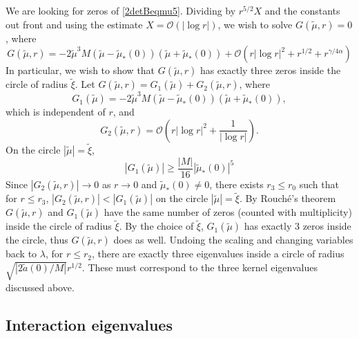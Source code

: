 \documentclass[thesis.tex]{subfiles}
\begin{document}
We are looking for zeros of \cref{2detBeqmu5}. Dividing by $r^{5/2}X$ and the constants out front and using the estimate $X = \mathcal{O}(|\log r|)$, we wish to solve $G(\tilde{\mu}, r) = 0$, where
\begin{equation}\label{2peigG}
G(\tilde{\mu}, r) = -2 \tilde{\mu}^3 M (\tilde{\mu} - \tilde{\mu}_*(0)) (\tilde{\mu} + \tilde{\mu}_*(0)) + \mathcal{O}\left( r |\log r|^2  + r^{1/2} + r^{\gamma/4 \alpha} \right)
\end{equation}
In particular, we wish to show that $G(\tilde{\mu}, r)$ has exactly three zeros inside the circle of radius $\tilde{\xi}$. Let $G(\tilde{\mu}, r) = G_1(\tilde{\mu}) + G_2(\tilde{\mu}, r)$, where 
\[
G_1(\tilde{\mu}) = -2 \tilde{\mu}^3 M (\tilde{\mu} - \tilde{\mu}_*(0)) (\tilde{\mu} + \tilde{\mu}_*(0)),
\]
which is independent of $r$, and
\[
G_2(\tilde{\mu}, r) = \mathcal{O}\left( r |\log r|^2 + \frac{1}{|\log r|} \right).
\]
On the circle $|\tilde{\mu}| = \tilde{\xi}$,
\[
|G_1(\tilde{\mu})| \geq \frac{|M|}{16}|\tilde{\mu}_*(0)|^5
\]
Since $|G_2(\tilde{\mu}, r)| \rightarrow 0$ as $r \rightarrow 0$ and $\tilde{\mu}_*(0) \neq 0$, there exists $r_3 \leq r_0$ such that for $r \leq r_3$, $|G_2(\tilde{\mu}, r)| < |G_1(\tilde{\mu})|$ on the circle $|\tilde{\mu}| = \tilde{\xi}$. By Rouch\'{e}'s theorem $G(\tilde{\mu}, r)$ and $G_1(\tilde{\mu})$ have the same number of zeros (counted with multiplicity) inside the circle of radius $\tilde{\xi}$. By the choice of $\tilde{\xi}$, $G_1(\tilde{\mu})$ has exactly 3 zeros inside the circle, thus $G(\tilde{\mu}, r)$ does as well. Undoing the scaling and changing variables back to $\lambda$, for $r \leq r_2$, there are exactly three eigenvalues inside a circle of radius $\sqrt{|2\tilde{a}(0)/M|}r^{1/2}$. These must correspond to the three kernel eigenvalues discussed above.

\subsection{Interaction eigenvalues}\label{sec:assyminteigs}
\end{document}
